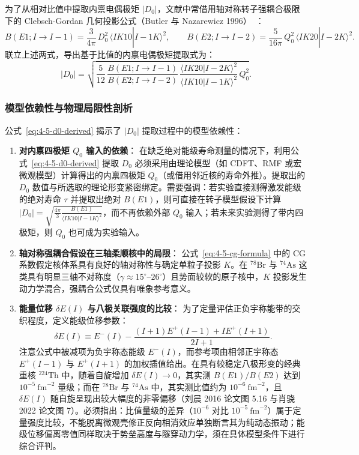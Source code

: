 为了从相对比值中提取内禀电偶极矩 $|D_0|$，文献中常借用轴对称转子强耦合极限下的 Clebsch-Gordan 几何投影公式（Butler 与 Nazarewicz 1996）~\cite{butler-1996-octupole-shapes}：
\begin{equation}\label{eq:4-5-cg-formula}
B(E1; I \to I-1) = \frac{3}{4\pi}\,D_0^2\,\langle I K 1 0 | I-1 K \rangle^2 , \qquad
B(E2; I \to I-2) = \frac{5}{16\pi}\,Q_0^2\,\langle I K 2 0 | I-2 K \rangle^2 .
\end{equation}
联立上述两式，导出基于比值的内禀电偶极矩提取式为：
\begin{equation}\label{eq:4-5-d0-derived}
|D_0| = \sqrt{\frac{5}{12}\,\frac{B(E1; I \to I-1)}{B(E2; I \to I-2)}\,\frac{\langle I K 2 0 | I-2 K \rangle^2}{\langle I K 1 0 | I-1 K \rangle^2}\,Q_0^2} .
\end{equation}

\subsubsection{模型依赖性与物理局限性剖析}

公式~\eqref{eq:4-5-d0-derived} 揭示了 $|D_0|$ 提取过程中的模型依赖性：
\begin{enumerate}
\item \textbf{对内禀四极矩 $Q_0$ 输入的依赖}：
在缺乏绝对能级寿命测量的情况下，利用公式~\eqref{eq:4-5-d0-derived} 提取 $D_0$ 必须采用由理论模型（如 CDFT、RMF 或宏微观模型）计算得出的内禀四极矩 $Q_0$（或借用邻近核的寿命外推）。提取出的 $D_0$ 数值与所选取的理论形变紧密绑定。需要强调：若实验直接测得激发能级的绝对寿命 $\tau$ 并提取出绝对 $B(E1)$，则可直接在转子模型假设下计算 $|D_0| = \sqrt{\frac{4\pi}{3} \frac{B(E1)}{\langle I K 1 0 | I-1 K \rangle^2}}$，而不再依赖外部 $Q_0$ 输入；若未来实验测得了带内四极矩，则 $Q_0$ 也可成为实验输入。
\item \textbf{轴对称强耦合假设在三轴柔顺核中的局限}：
公式~\eqref{eq:4-5-cg-formula} 中的 CG 系数假定核体系具有良好的轴对称性与确定单粒子投影 $K$。在 $^{78}\mathrm{Br}$ 与 $^{74}\mathrm{As}$ 这类具有明显三轴不对称度（$\gamma \approx 15^\circ$--$26^\circ$）且势面较软的原子核中，$K$ 投影发生动力学混合，强耦合公式仅具有唯象参考意义。
\item \textbf{能量位移 $\delta E(I)$ 与八极关联强度的比较}：
为了定量评估正负宇称能带的交织程度，定义能级位移参数：
\begin{equation}\label{eq:4-5-delta-e-def}
\delta E(I) \equiv E^-(I) - \frac{(I+1) E^+(I-1) + I E^+(I+1)}{2I + 1}.
\end{equation}
注意公式中被减项为负宇称态能级 $E^-(I)$，而参考项由相邻正宇称态 $E^+(I-1)$ 与 $E^+(I+1)$ 的加权插值给出。在具有较稳定八极形变的经典重核 $^{224}\mathrm{Th}$ 中，随着自旋增加 $\delta E(I) \to 0$，其实测 $B(E1)/B(E2)$ 达到 $10^{-5}\ \mathrm{fm}^{-2}$ 量级；而在 $^{78}\mathrm{Br}$ 与 $^{74}\mathrm{As}$ 中，其实测比值约为 $10^{-6}\ \mathrm{fm}^{-2}$，且 $\delta E(I)$ 随自旋呈现出较大幅度的非零偏移（刘晨 2016 论文图 5.16 与肖骁 2022 论文图 7）。必须指出：比值量级的差异（$10^{-6}$ 对比 $10^{-5}\ \mathrm{fm}^{-2}$）属于定量强度比较，不能脱离微观壳修正反向相消效应单独断言其为纯动态振动；能级位移偏离零值同样取决于势垒高度与隧穿动力学，须在具体模型条件下进行综合评判。
\end{enumerate}

